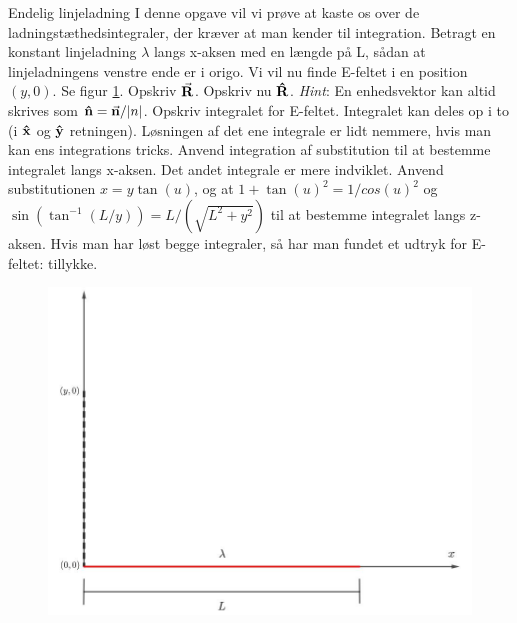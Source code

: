 \documentclass[crop=false, class=memoir]{standalone}
\begin{document}
\begin{opgave}[4]{Endelig linjeladning}
I denne opgave vil vi prøve at kaste os over de ladningstæthedsintegraler, der kræver at man kender til integration. Betragt en konstant linjeladning $\lambda$ langs x-aksen med en længde på L, sådan at linjeladningens venstre ende er i origo. Vi vil nu finde E-feltet i en position $(y,0)$. Se figur \ref{endeliglinje}.
\opg Opskriv $\va{R}$.
\opg Opskriv nu $\vu{R}$. \emph{Hint}: En enhedsvektor kan altid skrives som $\vu{n}=\va{n}/|n|$.
\opg Opskriv integralet for E-feltet.
\opg Integralet kan deles op i to (i $\vu{x}$ og $\vu{y}$ retningen). Løsningen af det ene integrale er lidt nemmere, hvis man kan ens integrations tricks. Anvend integration af substitution til at bestemme integralet langs x-aksen.
\opg Det andet integrale er mere indviklet. Anvend substitutionen $x=y\tan({u})$, og at $1+\tan({u})^2=1/cos({u})^2$ og $\sin({\tan^{-1}(L/y)})=L/(\sqrt{L^2+y^2})$ til at bestemme integralet langs z-aksen. Hvis man har løst begge integraler, så har man fundet et udtryk for E-feltet: tillykke.
    \begin{figure}
        \centering
        \includegraphics[scale=0.5]{Elektro/Elekfig/endeliglinje.JPG}
        \caption{}
        \label{endeliglinje}
    \end{figure}
\end{opgave}
\end{document}
